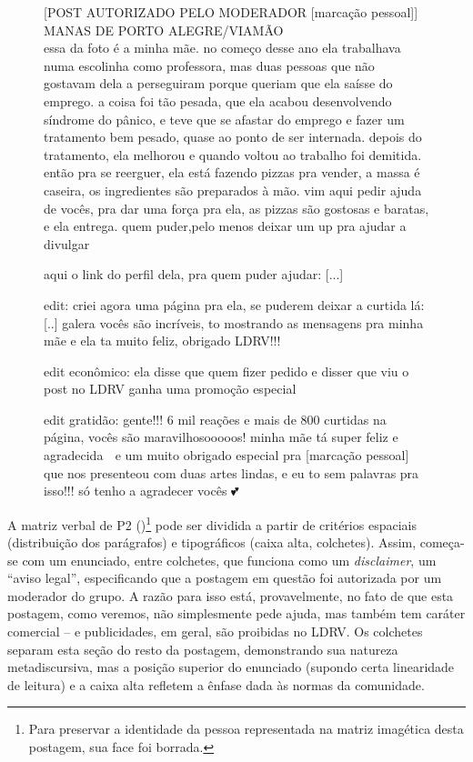 \documentclass{textolivre-html}
\begin{document}
\begin{figure}[htbp]
\begin{minipage}{0.5\textwidth}
 [POST AUTORIZADO PELO MODERADOR [marcação pessoal]]\\
 MANAS DE PORTO ALEGRE/VIAMÃO\\
 
 essa da foto é a minha mãe. no começo desse ano ela trabalhava numa escolinha como professora, mas   duas pessoas que não gostavam dela a perseguiram porque queriam que ela saísse do emprego. a coisa foi tão pesada, que ela acabou desenvolvendo síndrome do pânico, e teve que se afastar do emprego e fazer um tratamento bem pesado, quase ao ponto de ser internada. depois do tratamento, ela melhorou  e quando voltou ao trabalho foi demitida. então pra se reerguer, ela está fazendo pizzas pra vender, a massa é caseira, os ingredientes são preparados à mão. vim aqui pedir ajuda de vocês, pra dar uma força pra ela, as pizzas são gostosas e baratas, e ela entrega. quem puder,pelo menos deixar um up pra ajudar a divulgar {\Symbola 💖}
 
 aqui o link do perfil dela, pra quem puder ajudar: [...]
 
 edit: criei agora uma página pra ela, se puderem deixar a curtida lá: [..] galera vocês são   incríveis, to mostrando as mensagens pra minha mãe e ela ta muito feliz, obrigado LDRV!!!
 
 edit econômico: ela disse que quem fizer pedido e disser que viu o post no LDRV ganha uma promoção especial {\Symbola 💖}
 
 edit gratidão: gente!!! 6 mil reações e mais de 800 curtidas na página, vocês são maravilhosooooos!
 minha mãe tá super feliz e agradecida {\Symbola 💖} e um muito obrigado especial pra [marcação pessoal] que nos presenteou com duas artes lindas, e eu to sem palavras pra isso!!! só tenho a agradecer vocês {\Symbola 💕}
 \end{minipage}
\end{figure}

A matriz verbal de P2 ()\footnote{Para preservar a identidade da pessoa representada na matriz imagética desta postagem, sua face foi borrada.} pode ser dividida a partir de critérios espaciais (distribuição dos parágrafos) e tipográficos (caixa alta, colchetes). Assim, começa-se com um enunciado, entre colchetes, que funciona como um \textit{disclaimer}, um “aviso legal”, especificando que a postagem em questão foi autorizada por um moderador do grupo. A razão para isso está, provavelmente, no fato de que esta postagem, como veremos, não simplesmente pede ajuda, mas também tem caráter comercial -- e publicidades, em geral, são proibidas no LDRV. Os colchetes separam esta seção do resto da postagem, demonstrando sua natureza metadiscursiva, mas a posição superior do enunciado (supondo certa linearidade de leitura) e a caixa alta refletem a ênfase dada às normas da comunidade.
\end{document}
